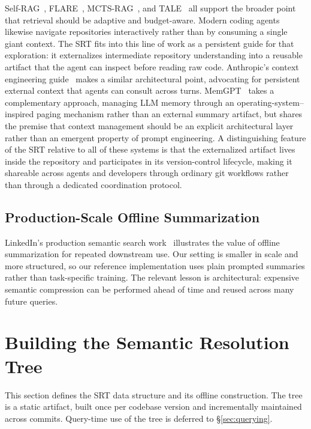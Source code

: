 \documentclass[11pt,a4paper]{article}
\newcommand{\srt}{\textsc{SRT}}
\begin{document}
Self-RAG~\cite{selfrag2024}, FLARE~\cite{flare2023}, MCTS-RAG~\cite{mctsrag2025}, and TALE~\cite{tale2025} all support the broader point that retrieval should be adaptive and budget-aware. Modern coding agents likewise navigate repositories interactively rather than by consuming a single giant context. The \srt{} fits into this line of work as a persistent guide for that exploration: it externalizes intermediate repository understanding into a reusable artifact that the agent can inspect before reading raw code. Anthropic's context engineering guide~\cite{anthropic2025context} makes a similar architectural point, advocating for persistent external context that agents can consult across turns. MemGPT~\cite{memgpt2023} takes a complementary approach, managing LLM memory through an operating-system--inspired paging mechanism rather than an external summary artifact, but shares the premise that context management should be an explicit architectural layer rather than an emergent property of prompt engineering. A distinguishing feature of the \srt{} relative to all of these systems is that the externalized artifact lives inside the repository and participates in its version-control lifecycle, making it shareable across agents and developers through ordinary git workflows rather than through a dedicated coordination protocol.

\subsection{Production-Scale Offline Summarization}

LinkedIn's production semantic search work~\cite{linkedin2026,mixlm2025} illustrates the value of offline summarization for repeated downstream use. Our setting is smaller in scale and more structured, so our reference implementation uses plain prompted summaries rather than task-specific training. The relevant lesson is architectural: expensive semantic compression can be performed ahead of time and reused across many future queries.

\section{Building the Semantic Resolution Tree}\label{sec:building}

This section defines the \srt{} data structure and its offline construction.
The tree is a static artifact, built once per codebase version and incrementally maintained across commits.
Query-time use of the tree is deferred to \S\ref{sec:querying}.
\end{document}
